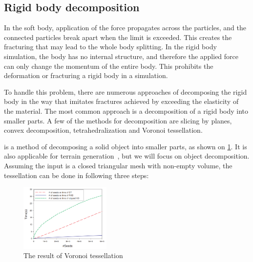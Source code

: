 \subsection{Rigid body decomposition}
In the soft body, application of the force propagates across the particles, and the connected particles break apart when the limit is exceeded. This creates the fracturing that may lead to the whole body splitting. In the rigid body simulation, the body has no internal structure, and therefore the applied force can only change the momentum of the entire body. This prohibits the deformation or fracturing a rigid body in a simulation.

To handle this problem, there are numerous approaches of decomposing the rigid body in the way that imitates fractures achieved by exceeding the elasticity of the material. The most common approach is a decomposition of a rigid body into smaller parts. A few of the methods for decomposition are slicing by planes, convex decomposition, tetrahedralization and Voronoi tessellation. 

 is a method of decomposing a solid object into smaller parts, as shown on \cref{fig:voro}. It is also applicable for \eg terrain generation~\cite{voronoiterrainrealtime}, but we will focus on object decomposition. Assuming the input is a closed triangular mesh with non-empty volume, the tessellation can be done in following three steps:

\begin{figure}
        \centering
        \includegraphics[width=0.4\textwidth]{img/clipped}
        \caption{The result of Voronoi tessellation \cite{yan2010efficient}}
        \label{fig:voro}
\end{figure}

